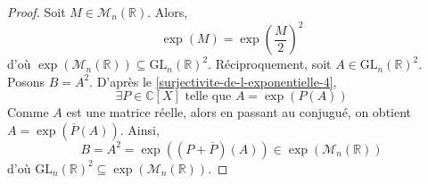   \begin{proof}
    Soit $M \in \mathcal{M}_n(\mathbb{R})$. Alors,
    \[ \exp(M) = \exp \left( \frac{M}{2} \right)^2 \]
    d'où $\exp(\mathcal{M}_n(\mathbb{R})) \subseteq \mathrm{GL}_n(\mathbb{R})^2$. Réciproquement, soit $A \in \mathrm{GL}_n(\mathbb{R})^2$. Posons $B = A^2$. D'après le \cref{surjectivite-de-l-exponentielle-4},
    \[ \exists P \in \mathbb{C}[X] \text{ telle que } A = \exp(P(A)) \]
    Comme $A$ est une matrice réelle, alors en passant au conjugué, on obtient $A = \exp(\overline{P}(A))$. Ainsi,
    \[ B = A^2 = \exp((P + \overline{P})(A)) \in \exp(\mathcal{M}_n(\mathbb{R})) \]
    d'où $\mathrm{GL}_n(\mathbb{R})^2 \subseteq \exp(\mathcal{M}_n(\mathbb{R}))$.
  \end{proof}

